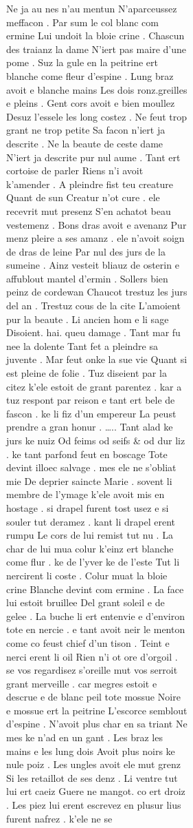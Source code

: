 \documentclass[
  letterpaper,
  DIV=11,
  numbers=noendperiod,
  oneside]{scrreprt}
\begin{document}
\begin{figure}
\begin{figure}
\begin{figure}
\begin{minipage}{0.20\linewidth}
{Ne ja} au nes {n'}au mentun {N'}aparceussez meffacon . Par sum le col
{blanc com ermine} Lui undoit la {bloie} crine . Chascun des traianz la
dame {N'iert pas maire} d'une pome . Suz la gule en la peitrine ert
{blanche come fleur d'espine} . {Lung braz} avoit e {blanche mains} Les
dois ronz.greilles e pleins . Gent cors avoit e bien moullez Desuz
l'essele les long costez . {Ne feut trop grant ne trop petite} Sa facon
{n'}iert {ja} descrite . {Ne} la beaute de ceste dame {N'}iert {ja}
descrite pur {nul} aume . Tant ert cortoise de parler {Riens n'}i avoit
k'amender . A pleindre fist teu creature Quant de sun Creatur {n'}ot
cure . ele recevrit mut presenz S'en achatot beau vestemenz . Bons dras
avoit e avenanz Pur menz pleire a ses amanz . ele {n'}avoit soign de
dras de leine Par nul des jurs de la sumeine . Ainz vesteit bliauz de
{osterin} e affublout mantel d'ermin . Sollers {bien peinz} de cordewan
Chaucot trestuz les jurs del an . Trestuz cous de la cite L'amoient pur
la beaute . Li ancien hom e li sage Disoient. hai. queu damage . Tant
mar fu nee la dolente Tant fet a pleindre sa juvente . Mar feut onke la
sue vie Quant si est pleine de folie . Tuz diseient par la citez k'ele
estoit de grant parentez . kar a tuz respont par reison e tant ert bele
de fascon . ke li fiz d'un empereur La peust prendre a gran honur .
\ldots.. Tant alad ke jurs ke nuiz Od feims od seifs \& od dur liz . ke
tant parfond feut en boscage Tote devint illoec salvage . mes ele {ne}
s'obliat {mie} De deprier saincte Marie . sovent li membre de l'ymage
k'ele avoit mis en hostage . si drapel furent tost usez e si souler tut
deramez . kant li drapel erent rumpu Le cors de lui remist tut nu . La
char de lui {mua colur} k'einz ert {blanche come flur} . ke de l'yver ke
de l'este Tut li {nercirent} li coste . {Colur muat la bloie crine}
{Blanche devint com ermine .} La face lui estoit {bruillee} Del grant
soleil e de gelee . La buche li ert entenvie e d'environ tote en
{nercie} . e tant avoit {neir} le menton {come co feust chief d'un tison
.} {Teint e nerci} erent li oil Rien n'i ot ore d'orgoil . se vos
regardisez s'oreille mut vos serroit grant merveille . car megres estoit
e descrue e de {blanc} peil tote mossue {Noire} e mossue ert la peitrine
L'escorce semblout d'espine . {N'}avoit {plus} char en sa triant {Ne mes
ke n'}ad en un gant . Les braz les mains e les lung dois Avoit {plus
noirs ke nule poiz .} Les ungles avoit ele mut grenz Si les retaillot de
ses denz . Li ventre tut lui ert caeiz Guere ne mangot. co ert droiz .
Les piez lui erent escrevez en plusur lius furent nafrez . k'ele {ne} se

\end{minipage}
\end{figure}
\end{figure}
\end{figure}
\end{document}
